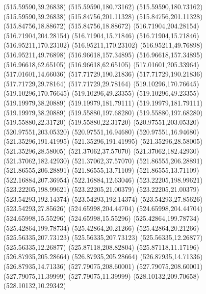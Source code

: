 {(515.59590,39.26838) (515.59590,180.73162) (515.59590,180.73162) (515.59590,39.26838) (515.84756,201.11328) (515.84756,201.11328) (515.84756,18.88672) (515.84756,18.88672)
(516.71904,204.28154) (516.71904,204.28154) (516.71904,15.71846) (516.71904,15.71846) (516.95211,170.23102) (516.95211,170.23102) (516.95211,49.76898) (516.95211,49.76898)
(516.96618,157.34895) (516.96618,157.34895) (516.96618,62.65105) (516.96618,62.65105) (517.01601,205.33964) (517.01601,14.66036) (517.71729,190.21836) (517.71729,190.21836)
(517.71729,29.78164) (517.71729,29.78164) (519.10296,170.76645) (519.10296,170.76645) (519.10296,49.23355) (519.10296,49.23355) (519.19979,38.20889) (519.19979,181.79111)
(519.19979,181.79111) (519.19979,38.20889) (519.55880,197.68280) (519.55880,197.68280) (519.55880,22.31720) (519.55880,22.31720) (520.97551,203.05320) (520.97551,203.05320)
(520.97551,16.94680) (520.97551,16.94680) (521.35296,191.41995) (521.35296,191.41995) (521.35296,28.58005) (521.35296,28.58005) (521.37062,37.57070) (521.37062,182.42930)
(521.37062,182.42930) (521.37062,37.57070) (521.86555,206.28891) (521.86555,206.28891) (521.86555,13.71109) (521.86555,13.71109) (522.16884,207.36954) (522.16884,12.63046)
(523.22205,198.99621) (523.22205,198.99621) (523.22205,21.00379) (523.22205,21.00379) (523.54293,192.14374) (523.54293,192.14374) (523.54293,27.85626) (523.54293,27.85626)
(524.65998,204.44704) (524.65998,204.44704) (524.65998,15.55296) (524.65998,15.55296) (525.42864,199.78734) (525.42864,199.78734) (525.42864,20.21266) (525.42864,20.21266)
(525.56335,207.73123) (525.56335,207.73123) (525.56335,12.26877) (525.56335,12.26877) (525.87118,208.82804) (525.87118,11.17196) (526.87935,205.28664) (526.87935,205.28664)
(526.87935,14.71336) (526.87935,14.71336) (527.79075,208.60001) (527.79075,208.60001) (527.79075,11.39999) (527.79075,11.39999) (528.10132,209.70658) (528.10132,10.29342)
}
